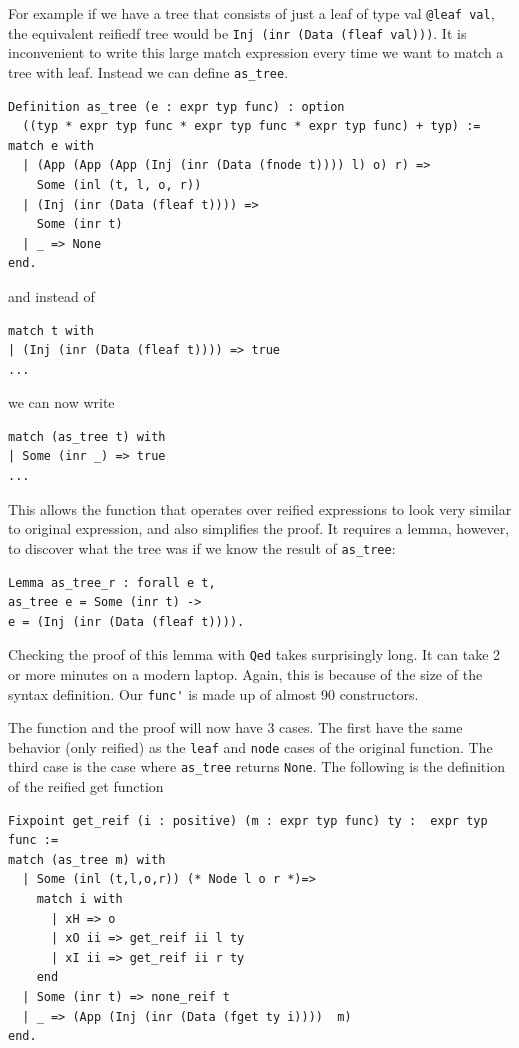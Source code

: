 \documentclass{puthesis}
\begin{document}
For example if we have a tree that consists of just a leaf of type val
\lstinline|@leaf val|, the equivalent reifiedf tree would be
\lstinline|Inj (inr (Data (fleaf val)))|. It is inconvenient to write
this large match expression every time we want to match a tree with
leaf. Instead we can define \lstinline|as_tree|.



\begin{lstlisting}
Definition as_tree (e : expr typ func) : option
  ((typ * expr typ func * expr typ func * expr typ func) + typ) := 
match e with
  | (App (App (App (Inj (inr (Data (fnode t)))) l) o) r) =>
    Some (inl (t, l, o, r))
  | (Inj (inr (Data (fleaf t)))) =>
    Some (inr t)
  | _ => None
end.
\end{lstlisting}

and instead of 

\begin{lstlisting}
match t with
| (Inj (inr (Data (fleaf t)))) => true
...
\end{lstlisting}

we can now write

\begin{lstlisting}
match (as_tree t) with
| Some (inr _) => true
...
\end{lstlisting}

This allows the function that operates over reified expressions to look very
similar to original expression, and also simplifies the proof. It
requires a lemma, however, to discover what the tree was if we know
the result of \lstinline|as_tree|:

\begin{lstlisting}
Lemma as_tree_r : forall e t,
as_tree e = Some (inr t) ->
e = (Inj (inr (Data (fleaf t)))).
\end{lstlisting}

Checking the proof of this lemma with \lstinline|Qed| takes
surprisingly long. It can take 2 or more minutes on a modern
laptop. Again, this is because of the size of the syntax definition.
Our \lstinline|func'| is made up of almost 90 constructors.

The function and the proof will now have 3 cases. The first have the
same behavior (only reified) as the \lstinline|leaf| and
\lstinline|node| cases of the original function. The third case is the
case where \lstinline|as_tree| returns \lstinline|None|. The following is the
definition of the reified get function

\begin{lstlisting}
Fixpoint get_reif (i : positive) (m : expr typ func) ty :  expr typ func :=
match (as_tree m) with
  | Some (inl (t,l,o,r)) (* Node l o r *)=>
    match i with 
      | xH => o
      | xO ii => get_reif ii l ty 
      | xI ii => get_reif ii r ty 
    end
  | Some (inr t) => none_reif t
  | _ => (App (Inj (inr (Data (fget ty i))))  m)
end.
\end{lstlisting}
\end{document}
